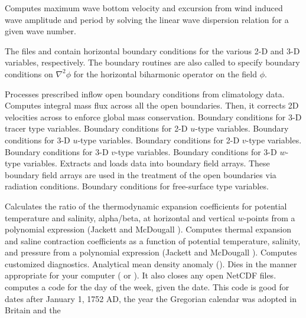 \begin{klist}
\begin{klist}
        Computes maximum wave bottom velocity and
   excursion from wind induced wave amplitude and period by
   solving the linear wave dispersion relation for a given
   wave number.
   \end{klist}
 The files  and 
contain horizontal boundary conditions for the various 2-D and 3-D
variables, respectively.  The boundary routines are also called to
specify boundary conditions on $\nabla^2 \phi$ for the horizontal
biharmonic operator on the field $\phi$.
   \begin{klist}
      Processes prescribed inflow open boundary conditions
  from climatology data.
      Computes integral mass flux across  all the
  open boundaries. Then, it corrects 2D velocities across to enforce
  global mass conservation.
      Boundary conditions for 3-D tracer type variables.
      Boundary conditions for 2-D $u$-type variables.
      Boundary conditions for 3-D $u$-type variables.
      Boundary conditions for 2-D $v$-type variables.
      Boundary conditions for 3-D $v$-type variables.
      Boundary conditions for 3-D $w$-type variables.
      Extracts and loads data into boundary field
   arrays. These boundary field arrays are used in the treatment
   of the open boundaries via radiation conditions.
      Boundary conditions for free-surface type variables.
   \end{klist}
 \mbox{}
   \begin{klist}
       Calculates the ratio of the thermodynamic
   expansion coefficients for potential temperature and salinity,
   alpha/beta, at horizontal and vertical $w$-points from a polynomial
   expression (Jackett and McDougall \cite{Jackett}).
       Computes thermal expansion and saline
   contraction coefficients as a function of potential temperature,
   salinity, and pressure from a polynomial expression (Jackett and
   McDougall \cite{Jackett}).
      Computes customized diagnostics.
       Analytical mean density anomaly
   ().
         Dies in the manner appropriate for your
  computer ( or ).  It also closes any open
  NetCDF files.
       computes a code for the day of the week, given
    the date. This code is good for dates after January 1, 1752 AD,
    the year the Gregorian calendar was adopted in Britain and the

\end{klist}
\end{klist}
